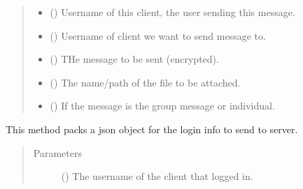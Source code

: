 \documentclass[letterpaper,10pt,english]{sphinxmanual}
\begin{document}
\begin{fulllineitems}
\begin{fulllineitems}
\begin{quote}
\begin{description}
\begin{itemize}
\item {} 
 () \textendash{} Username of this client, the user sending this message.

\item {} 
 () \textendash{} Username of client we want to send message to.

\item {} 
 () \textendash{} THe message to be sent (encrypted).

\item {} 
 () \textendash{} The name/path of the file to be attached.

\item {} 
 () \textendash{} If the message is the group message or individual.

\end{itemize}

\end{description}\end{quote}

\end{fulllineitems}


\begin{fulllineitems}
\label{\detokenize{clientHelper:clientHelper.Client.packJSONlogin}}
This method packs a json object for the login info to send to server.
\begin{quote}\begin{description}
\item[{Parameters}] \leavevmode
{} () \textendash{} The username of the client that logged in.

\end{description}\end{quote}


\end{fulllineitems}
\end{fulllineitems}
\end{document}
